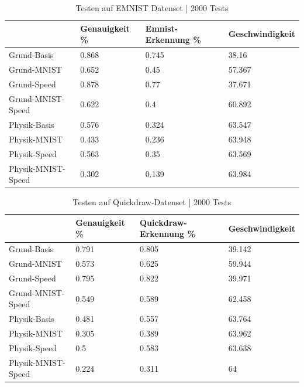 \begin{table}[!ht]
    \centering
    \caption{Testen auf EMNIST Datenset | 2000 Tests}
    \begin{tabular}{|l|l|l|l|}
    \hline
        ~ & Genauigkeit \% & Emnist-Erkennung \% & Geschwindigkeit \\ \hline
        Grund-Basis & 0.868 & 0.745 & 38.16 \\ \hline
        Grund-MNIST & 0.652 & 0.45 & 57.367 \\ \hline
        Grund-Speed & 0.878 & 0.77 & 37.671 \\ \hline
        Grund-MNIST-Speed & 0.622 & 0.4 & 60.892 \\ \hline
        Physik-Basis & 0.576 & 0.324 & 63.547 \\ \hline
        Physik-MNIST & 0.433 & 0.236 & 63.948 \\ \hline
        Physik-Speed & 0.563 & 0.35 & 63.569 \\ \hline
        Physik-MNIST-Speed & 0.302 & 0.139 & 63.984 \\ \hline
    \end{tabular}
    \label{tab:EMNIST}
\end{table}

\begin{table}[!ht]
    \centering
    \caption{Testen auf Quickdraw-Datenset | 2000 Tests}
    \begin{tabular}{|l|l|l|l|}
    \hline
        ~ & Genauigkeit \% & Quickdraw-Erkennung \% & Geschwindigkeit \\ \hline
        Grund-Basis & 0.791 & 0.805 & 39.142 \\ \hline
        Grund-MNIST & 0.573 & 0.625 & 59.944 \\ \hline
        Grund-Speed & 0.795 & 0.822 & 39.971 \\ \hline
        Grund-MNIST-Speed & 0.549 & 0.589 & 62.458 \\ \hline
        Physik-Basis & 0.481 & 0.557 & 63.764 \\ \hline
        Physik-MNIST & 0.305 & 0.389 & 63.962 \\ \hline
        Physik-Speed & 0.5 & 0.583 & 63.638 \\ \hline
        Physik-MNIST-Speed & 0.224 & 0.311 & 64 \\ \hline
    \end{tabular}
    \label{tab:Quickdraw}
\end{table}

\newpage

